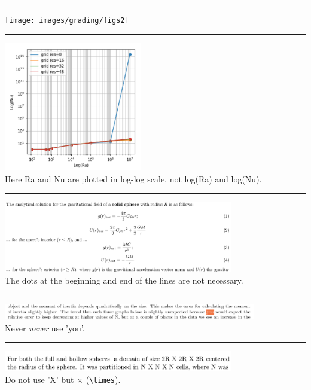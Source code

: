 \par\noindent\rule{\textwidth}{0.4pt}
\begin{center}
\texttt{[image: images/grading/figs2]}
\end{center}

\par\noindent\rule{\textwidth}{0.4pt}
\begin{center}
\includegraphics[width=6cm]{images/grading/loglogpb}\\
Here Ra and Nu are plotted in log-log scale, not log(Ra) and log(Nu).
\end{center}

\par\noindent\rule{\textwidth}{0.4pt}
\begin{center}
\includegraphics[width=10cm]{images/grading/dots}\\
The dots at the beginning and end of the lines are not necessary.
\end{center}

\par\noindent\rule{\textwidth}{0.4pt}
\begin{center}
\includegraphics[width=11cm]{images/grading/you}\\
Never {\it never} use 'you'. 
\end{center}

\par\noindent\rule{\textwidth}{0.4pt}
\begin{center}
\includegraphics[width=10cm]{images/grading/cross}\\
Do not use 'X' but $\times$ (\verb|\times|).
\end{center}




